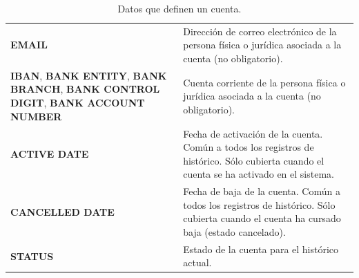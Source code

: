 \begin{table}
{\begin{tabular}{|m{5cm} m{9cm}|}
	\textbf{EMAIL} & Dirección de correo electrónico de la persona física o jurídica asociada a la cuenta (no obligatorio).\\
	\textbf{IBAN}, \textbf{BANK ENTITY}, \textbf{BANK BRANCH}, \textbf{BANK CONTROL DIGIT}, \textbf{BANK ACCOUNT NUMBER} & Cuenta corriente de la persona física o jurídica asociada a la cuenta (no obligatorio).\\
	\textbf{ACTIVE DATE} & Fecha de activación de la cuenta. Común a todos los registros de histórico. Sólo cubierta cuando el cuenta se ha activado en el sistema.\\	
	\textbf{CANCELLED DATE} & Fecha de baja de la cuenta. Común a todos los registros de histórico. Sólo cubierta cuando el cuenta ha cursado baja (estado cancelado).	\\
	\textbf{STATUS} & Estado de la cuenta para el histórico actual.	
	\\\hline
  \end{tabular}
  } %
  \caption{Datos que definen un cuenta.}
  \label{tab:cuenta}
\end{table}

